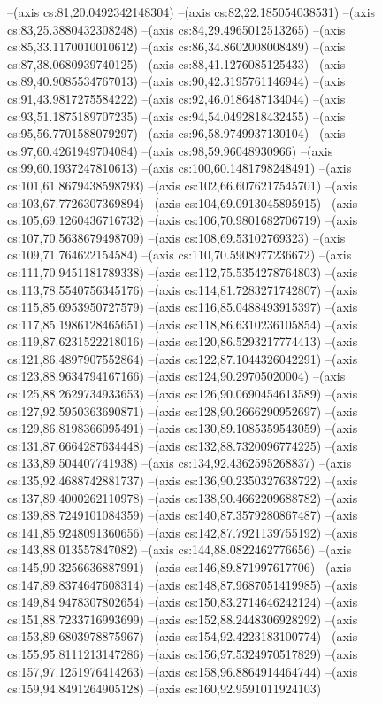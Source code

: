 --(axis cs:81,20.0492342148304)
--(axis cs:82,22.185054038531)
--(axis cs:83,25.3880432308248)
--(axis cs:84,29.4965012513265)
--(axis cs:85,33.1170010010612)
--(axis cs:86,34.8602008008489)
--(axis cs:87,38.0680939740125)
--(axis cs:88,41.1276085125433)
--(axis cs:89,40.9085534767013)
--(axis cs:90,42.3195761146944)
--(axis cs:91,43.9817275584222)
--(axis cs:92,46.0186487134044)
--(axis cs:93,51.1875189707235)
--(axis cs:94,54.0492818432455)
--(axis cs:95,56.7701588079297)
--(axis cs:96,58.9749937130104)
--(axis cs:97,60.4261949704084)
--(axis cs:98,59.96048930966)
--(axis cs:99,60.1937247810613)
--(axis cs:100,60.1481798248491)
--(axis cs:101,61.8679438598793)
--(axis cs:102,66.6076217545701)
--(axis cs:103,67.7726307369894)
--(axis cs:104,69.0913045895915)
--(axis cs:105,69.1260436716732)
--(axis cs:106,70.9801682706719)
--(axis cs:107,70.5638679498709)
--(axis cs:108,69.53102769323)
--(axis cs:109,71.764622154584)
--(axis cs:110,70.5908977236672)
--(axis cs:111,70.9451181789338)
--(axis cs:112,75.5354278764803)
--(axis cs:113,78.5540756345176)
--(axis cs:114,81.7283271742807)
--(axis cs:115,85.6953950727579)
--(axis cs:116,85.0488493915397)
--(axis cs:117,85.1986128465651)
--(axis cs:118,86.6310236105854)
--(axis cs:119,87.6231522218016)
--(axis cs:120,86.5293217774413)
--(axis cs:121,86.4897907552864)
--(axis cs:122,87.1044326042291)
--(axis cs:123,88.9634794167166)
--(axis cs:124,90.29705020004)
--(axis cs:125,88.2629734933653)
--(axis cs:126,90.0690454613589)
--(axis cs:127,92.5950363690871)
--(axis cs:128,90.2666290952697)
--(axis cs:129,86.8198366095491)
--(axis cs:130,89.1085359543059)
--(axis cs:131,87.6664287634448)
--(axis cs:132,88.7320096774225)
--(axis cs:133,89.504407741938)
--(axis cs:134,92.4362595268837)
--(axis cs:135,92.4688742881737)
--(axis cs:136,90.2350327638722)
--(axis cs:137,89.4000262110978)
--(axis cs:138,90.4662209688782)
--(axis cs:139,88.7249101084359)
--(axis cs:140,87.3579280867487)
--(axis cs:141,85.9248091360656)
--(axis cs:142,87.7921139755192)
--(axis cs:143,88.013557847082)
--(axis cs:144,88.0822462776656)
--(axis cs:145,90.3256636887991)
--(axis cs:146,89.871997617706)
--(axis cs:147,89.8374647608314)
--(axis cs:148,87.9687051419985)
--(axis cs:149,84.9478307802654)
--(axis cs:150,83.2714646242124)
--(axis cs:151,88.7233716993699)
--(axis cs:152,88.2448306928292)
--(axis cs:153,89.6803978875967)
--(axis cs:154,92.4223183100774)
--(axis cs:155,95.8111213147286)
--(axis cs:156,97.5324970517829)
--(axis cs:157,97.1251976414263)
--(axis cs:158,96.8864914464744)
--(axis cs:159,94.8491264905128)
--(axis cs:160,92.9591011924103)
